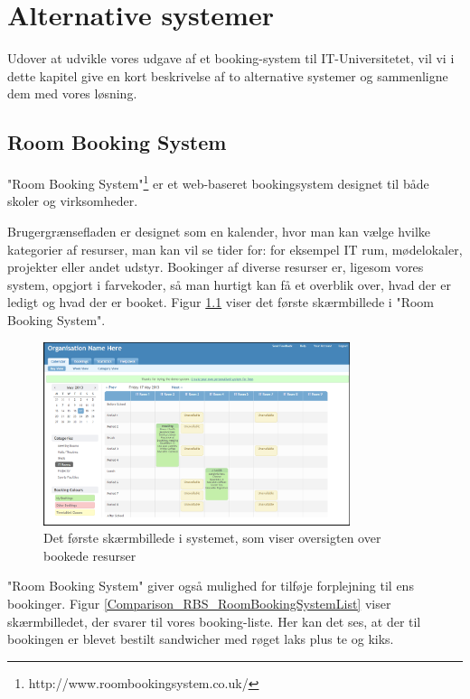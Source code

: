\chapter{Alternative systemer}
\label{Comparison}
Udover at udvikle vores udgave af et booking-system til IT-Universitetet, vil vi i dette kapitel give en kort beskrivelse af to alternative  systemer og sammenligne dem med vores løsning.

\section{Room Booking System}
\label{Comparison_RBS}
"Room Booking System"\footnote{http://www.roombookingsystem.co.uk/} er et web-baseret bookingsystem designet til både skoler og virksomheder. 

Brugergrænsefladen er designet som en kalender, hvor man kan vælge hvilke kategorier af resurser, man kan vil se tider for: for eksempel IT rum, mødelokaler, projekter eller andet udstyr. Bookinger af diverse resurser er, ligesom vores system, opgjort i farvekoder, så man hurtigt kan få et overblik over, hvad der er ledigt og hvad der er booket. Figur \ref{Comparison_RBS_RoomBookingSystem} viser det første skærmbillede i "Room Booking System".

\begin{figure}[h!]
  \centering
    \includegraphics[width=0.8\textwidth]{Appendix/GUI-Prototype/RoomBookingSystem}
  \caption{Det første skærmbillede i systemet, som viser oversigten over bookede resurser}
\label{Comparison_RBS_RoomBookingSystem}
\end{figure}

"Room Booking System" giver også mulighed for tilføje forplejning til ens bookinger. Figur \ref{Comparison_RBS_RoomBookingSystemList} viser skærmbilledet, der svarer til vores booking-liste. Her kan det ses, at der til bookingen er blevet bestilt sandwicher med røget laks plus te og kiks.

